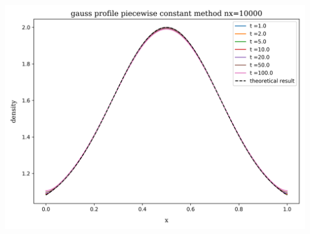 \begin{frame}
\begin{columns}
			\includegraphics[height=.33\textheight]{../results/1D/pwconst/nx=10000/plot_advection_gauss_pwconst_nx=10000.png}
	\end{columns}
\end{frame}
